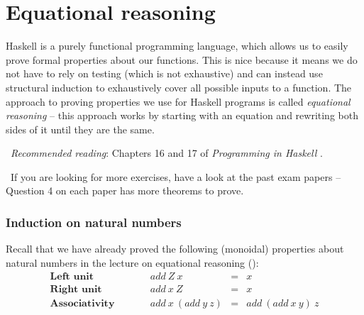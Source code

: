 \section{Equational reasoning}

Haskell is a purely functional programming language, which allows us to easily prove formal properties about our functions. This is nice because it means we do not have to rely on testing (which is not exhaustive) and can instead use structural induction to exhaustively cover all possible inputs to a function. The approach to proving properties we use for Haskell programs is called \emph{equational reasoning} -- this approach works by starting with an equation and rewriting both sides of it until they are the same. 

\makebox[0.5cm]{\faBook}~\emph{Recommended reading}: Chapters 16 and 17 of \emph{Programming in Haskell} \citep{hutton2016programming}.

\makebox[0.5cm]{\faLightbulbO}~If you are looking for more exercises, have a look at the past exam papers -- Question 4 on each paper has more theorems to prove.

\subsubsection{Induction on natural numbers}

Recall that we have already proved the following (monoidal) properties about natural numbers in the lecture on equational reasoning ():
\begin{displaymath}
\begin{array}{lcrcl}
\textbf{Left unit} &\qquad & \mathit{add}~Z~x & = & x \\
\textbf{Right unit} &\qquad & \mathit{add}~x~Z & = & x \\
\textbf{Associativity} & \qquad & \mathit{add}~x~(\mathit{add}~y~z) & = & \mathit{add}~(\mathit{add}~x~y)~z 
\end{array}
\end{displaymath}

\taskLine


